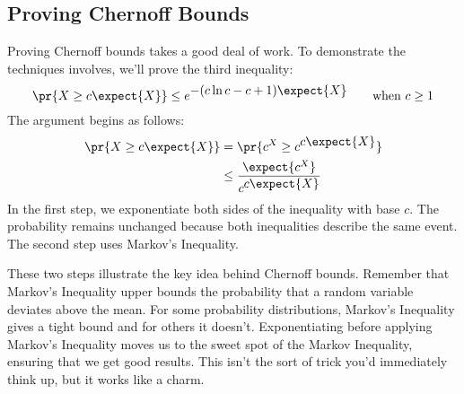 \begin{editingnotes}

\subsection{Proving Chernoff Bounds}

Proving Chernoff bounds takes a good deal of work.  To demonstrate the
techniques involves, we'll prove the third inequality:
%
\[
\pr{X \geq c \expect{X}} \leq e^{\textstyle -(c \ln c - c + 1) \expect{X}}
    \qquad \text{when $c \geq 1$}
\]
%
The argument begins as follows:
%
\begin{align}
\pr{X \geq c \expect{X}}
  & = \pr{c^{X} \geq c^{\textstyle c \expect{X}}} \notag \\
  & \leq \frac{\expect{c^X}}{c^{\textstyle c \expect{X}}} \label{eqn:chernoffbase}
\end{align}
%
In the first step, we exponentiate both sides of the inequality with
base $c$.  The probability remains unchanged because both inequalities
describe the same event.  The second step uses Markov's Inequality.

These two steps illustrate the key idea behind Chernoff bounds.
Remember that Markov's Inequality upper bounds the probability that a
random variable deviates above the mean.  For some probability
distributions, Markov's Inequality gives a tight bound and for others
it doesn't.  Exponentiating before applying Markov's Inequality moves
us to the sweet spot of the Markov Inequality, ensuring that we get
good results.  This isn't the sort of trick you'd immediately think
up, but it works like a charm.


\end{editingnotes}
